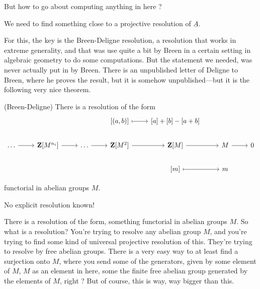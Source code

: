 But how to go about computing anything in here ? 

\begin{goal}
We need to find something close to a projective resolution of $\underline{A}$.
\end{goal}

For this, the key is the Breen-Deligne resolution, a resolution that works in extreme generality, and that was use quite a bit by Breen in a certain setting in algebraic geometry to do some computations. 
But the statement we needed, was never actually put in by Breen. There is an unpublished letter of Deligne to Breen, where he proves the result, but it is somehow unpublished---but it is the following very nice theorem.

\begin{theorem}(Breen-Deligne) \label{theorem:04-breen-deligne}
There is a resolution of the form
\[\begin{tikzcd}
	&&& {[(a,b)]} & {[a]+[b]-[a+b]} \\
	\ldots & {\Z[M^{n_i}]} & \ldots & {\Z[M^2]} & {\Z[M]} & M & 0 \\
	&&&& {[m]} & m
	\arrow[maps to, from=1-4, to=1-5]
	\arrow[from=2-1, to=2-2]
	\arrow[from=2-2, to=2-3]
	\arrow[from=2-3, to=2-4]
	\arrow[from=2-4, to=2-5]
	\arrow[from=2-5, to=2-6]
	\arrow[from=2-6, to=2-7]
	\arrow[maps to, from=3-5, to=3-6]
\end{tikzcd}\]

functorial in abelian groups $M$.

\end{theorem}

\begin{warning}
No explicit resolution known!
\end{warning}

There is a resolution of the form, something functorial in abelian groups $M$. So what is a resolution? You're trying to resolve any abelian group $M$, and you're trying to find some kind of universal projective resolution of this. They're trying to resolve by free abelian groups. There is a very easy way to at least find a surjection onto $M$, where you send some of the generators, given by some element of $M$, $M$ as an element in here, some the finite free abelian group generated by the elements of $M$, right ? But of course, this is way, way bigger than this.

